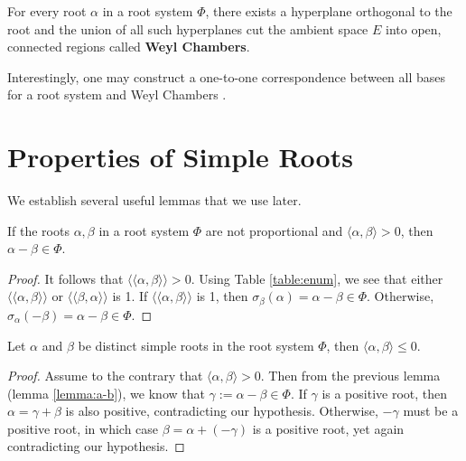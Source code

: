 For every root $\alpha$ in a root system $\Phi$, there exists a hyperplane orthogonal to the root
and the union of all such hyperplanes cut the ambient space $E$ into open, connected regions
called \textbf{Weyl Chambers}. \newline

Interestingly, one may construct a one-to-one correspondence between all bases
for a root system and Weyl Chambers \cite{humphreys_1972_Weyl}.

\section{Properties of Simple Roots}

We establish several useful lemmas that we use later.

\begin{lemma}
    \label{lemma:a-b}
    If the roots $\alpha, \beta$ in a root system $\Phi$ are not proportional and
    $\langle \alpha, \beta \rangle > 0$, then $\alpha - \beta \in \Phi$.
\end{lemma}

\begin{proof}
    It follows that $\langle \langle \alpha, \beta \rangle \rangle > 0$.
    Using Table \ref{table:enum}, we see that either $\langle \langle \alpha, \beta \rangle \rangle$ or 
    $\langle \langle \beta, \alpha \rangle \rangle$ is 1.
    If $\langle \langle \alpha, \beta \rangle \rangle$ is 1,
    then $\sigma_{\beta}(\alpha) = \alpha - \beta \in \Phi$.
    Otherwise, $\sigma_{\alpha}(-\beta) = \alpha - \beta \in \Phi$.
\end{proof}

\begin{lemma}
    \label{lemma:a.b_leq_0}
    Let $\alpha$ and $\beta$ be distinct simple roots in the root system $\Phi$,
    then $\langle \alpha, \beta \rangle \leq 0$.
\end{lemma}

\begin{proof}
    Assume to the contrary that $\langle \alpha, \beta \rangle > 0$.
    Then from the previous lemma (lemma \ref{lemma:a-b}),
    we know that $\gamma := \alpha - \beta \in \Phi$.
    If $\gamma$ is a positive root, then $\alpha = \gamma + \beta$ is also positive,
    contradicting our hypothesis. Otherwise, $-\gamma$ must be a positive root, in which case
    $\beta = \alpha + (-\gamma)$ is a positive root, yet again contradicting our hypothesis.
\end{proof}

